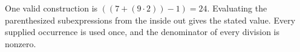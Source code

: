 One valid construction is $\boxed{((7+(9\cdot 2))-1)=24}$. Evaluating the parenthesized subexpressions from the inside out gives the stated value. Every supplied occurrence is used once, and the denominator of every division is nonzero.
